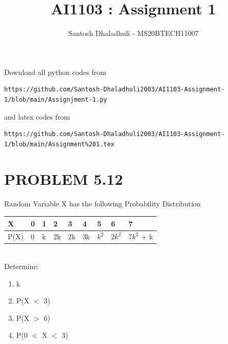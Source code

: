 \documentclass[journal,12pt,twocolumn]{IEEEtran}
\begin{document}
     \def\rightbox#1{\makebox[0in][r]{#1}}
     \def\centbox#1{\makebox[0in]{#1}}
     \def\topbox#1{\raisebox{-\baselineskip}[0in][0in]{#1}}
     \def\midbox#1{\raisebox{-0.5\baselineskip}[0in][0in]{#1}}
\vspace{3cm}
\title{AI1103 : Assignment 1}
\author{Santosh Dhaladhuli - MS20BTECH11007}
\maketitle
\newpage
\bigskip
\renewcommand{\thefigure}{\theenumi}
\renewcommand{\thetable}{\theenumi}
Download all python codes from 
\begin{lstlisting}
https://github.com/Santosh-Dhaladhuli2003/AI1103-Assignment-1/blob/main/Assignjment-1.py
\end{lstlisting}
%
and latex codes from 
%
\begin{lstlisting}
https://github.com/Santosh-Dhaladhuli2003/AI1103-Assignment-1/blob/main/Assignment%201.tex
\end{lstlisting}
\section*{PROBLEM 5.12}
Random Variable X has the following Probability Distribution \\
\begin{table}[h]
\begin{tabular}{|l|l|l|l|l|l|l|l|l|}

\hline
X    & 0 & 1 & 2  & 3  & 4  & 5   & 6  & 7                     \\ \hline    
P(X) & 0 & k & 2k & 2k & 3k & $k^2$ & $2k^2$ & $7k^2$ + k \\ 
\hline
\end{tabular}
\end{table} 
\\
Determine:
\begin{enumerate}
\item k 
\item P(X $<$ 3) 
\item P(X $>$ 6)  
\item P(0 $<$ X $<$ 3) 
\end{enumerate}
\end{document}
